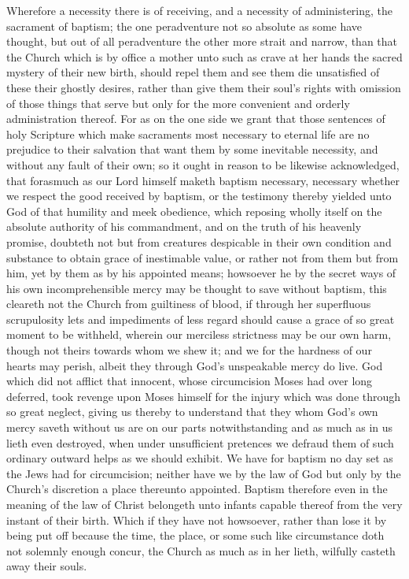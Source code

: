 Wherefore a necessity there is of receiving, and a necessity of administering, the sacrament of baptism; the one peradventure not so absolute as some have thought, but out of all peradventure the other more strait and narrow, than that the Church which is by office a mother unto such as crave at her hands the sacred mystery of their new birth, should repel them and see them die unsatisfied of these their ghostly desires, rather than give them their soul’s rights with omission of those things that serve but only for the more convenient and orderly administration thereof. For as on the one side we grant that those sentences of holy Scripture which make sacraments most necessary to eternal life are no prejudice to their salvation that want them by some inevitable necessity, and without any fault of their own; so it ought in reason to be likewise acknowledged, that forasmuch as our Lord himself maketh  baptism necessary, necessary whether we respect the good received by baptism, or the testimony thereby yielded unto God of that humility and meek obedience, which reposing wholly itself on the absolute authority of his commandment, and on the truth of his heavenly promise, doubteth not but from creatures despicable in their own condition and substance to obtain grace of inestimable value, or rather not from them but from him, yet by them as by his appointed means; howsoever he by the secret ways of his own incomprehensible mercy may be thought to save without baptism, this cleareth not the Church from guiltiness of blood, if through her superfluous scrupulosity lets and impediments of less regard should cause a grace of so great moment to be withheld, wherein our merciless strictness may be our own harm, though not theirs towards whom we shew it; and we for the hardness of our hearts may perish, albeit they through God’s unspeakable mercy do live. God which did not afflict that innocent, whose circumcision Moses had over long deferred, took revenge upon Moses himself for the injury which was done through so great neglect, giving us thereby to understand that they whom God’s own mercy saveth without us are on our parts notwithstanding and as much as in us lieth even destroyed, when under unsufficient pretences we defraud them of such ordinary outward helps as we should exhibit. We have for baptism no day set as the Jews had for circumcision; neither have we by the law of God but only by the Church’s discretion a place thereunto appointed. Baptism therefore even in the meaning of the law of Christ belongeth unto infants capable thereof from the very instant of their birth. Which if they have not howsoever, rather than lose it by being put off because the time, the place, or some such like circumstance doth not solemnly enough concur, the Church as much as in her lieth, wilfully casteth away their souls.

